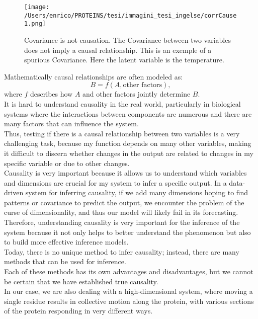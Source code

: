\documentclass[English, Lau, oneside]{sapthesis}
\begin{document}
\begin{figure}[h]
    \centering
    \texttt{[image: /Users/enrico/PROTEINS/tesi/immagini\_tesi\_ingelse/corrCause1.png]}    
    \caption{Covariance is not causation. The Covariance between two variables does not imply a causal relationship. This is an exemple of a spurious Covariance. Here the latent variable is the temperature.}
    \label{fig:Covariance is not causation}
\end{figure}
\newpage
Mathematically causal relationships are often modeled as:\cite{ref14}
\[
B = f(A, \text{other factors}),
\]
where \( f \) describes how \( A \) and other factors jointly determine \( B \).\\
It is hard to understand causality in the real world, particularly in biological systems where the interactions between components are numerous and there are many factors that can influence the system. \\
Thus, testing if there is a causal relationship between two variables is a very challenging task, because my function depends on many other variables, making it difficult to discern whether changes in the output are related to changes in my specific variable or due to other changes. \\
Causality is very important because it allows us to understand which variables and dimensions are crucial for my system to infer a specific output. In a data-driven system for inferring causality, if we add many dimensions hoping to find patterns or covariance to predict the output, we encounter the problem of the curse of dimensionality, and thus our model will likely fail in its forecasting. \\
Therefore, understanding causality is very important for the inference of the system because it not only helps to better understand the phenomenon but also to build more effective inference models. \\
Today, there is no unique method to infer causality; instead, there are many methods that can be used for inference. \\
Each of these methods has its own advantages and disadvantages, but we cannot be certain that we have established true causality. \\
In our case, we are also dealing with a high-dimensional system, where moving a single residue results in collective motion along the protein, with various sections of the protein responding in very different ways.\\
\end{document}
